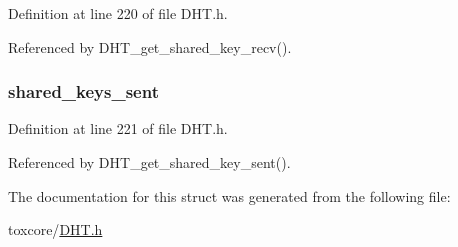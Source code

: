 Definition at line 220 of file D\+H\+T.\+h.



Referenced by D\+H\+T\+\_\+get\+\_\+shared\+\_\+key\+\_\+recv().

\hypertarget{struct_d_h_t_a07b2f51891b851ec0cd7dfe729412f77}{
\subsubsection[{shared\+\_\+keys\+\_\+sent}]{ shared\+\_\+keys\+\_\+sent}}\label{struct_d_h_t_a07b2f51891b851ec0cd7dfe729412f77}


Definition at line 221 of file D\+H\+T.\+h.



Referenced by D\+H\+T\+\_\+get\+\_\+shared\+\_\+key\+\_\+sent().



The documentation for this struct was generated from the following file\+:\begin{DoxyCompactItemize}
\item 
toxcore/\hyperlink{_d_h_t_8h}{D\+H\+T.\+h}\end{DoxyCompactItemize}
